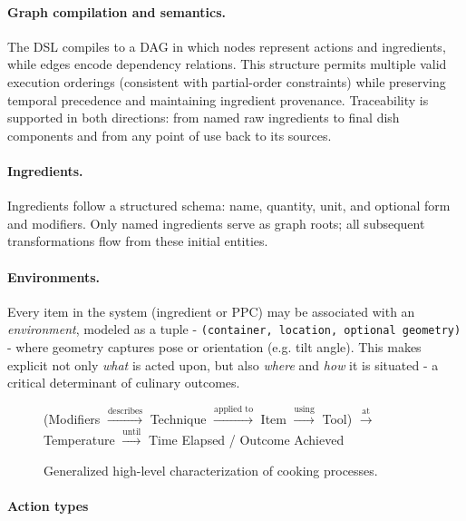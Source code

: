 \documentclass[sigconf]{acmart}
\begin{document}
\paragraph{Graph compilation and semantics.} The DSL compiles to a DAG in which nodes represent actions and ingredients, while edges encode dependency relations. This structure permits multiple valid execution orderings (consistent with partial-order constraints) while preserving temporal precedence and maintaining ingredient provenance. Traceability is supported in both directions: from named raw ingredients to final dish components and from any point of use back to its sources.

\paragraph{Ingredients.} Ingredients follow a structured schema: name, quantity, unit, and optional form and modifiers. Only named ingredients serve as graph roots; all subsequent transformations flow from these initial entities.

\paragraph{Environments.} Every item in the system (ingredient or PPC) may be associated with an \emph{environment}, modeled as a tuple - \texttt{(container, location, optional geometry)} - where geometry captures pose or orientation (e.g. tilt angle). This makes explicit not only \emph{what} is acted upon, but also \emph{where} and \emph{how} it is situated - a critical determinant of culinary outcomes.

\begin{figure}[h]
    \centering
    (Modifiers $\xrightarrow{\text{describes}}$ Technique $\xrightarrow{\text{applied to}}$ Item $\xrightarrow{\text{using}}$ Tool) $\xrightarrow{\text{at}}$ Temperature $\xrightarrow{\text{until}}$ Time Elapsed / Outcome Achieved
    \caption{Generalized high-level characterization of cooking processes.}
\end{figure}

\paragraph{Action types} 
\end{document}
